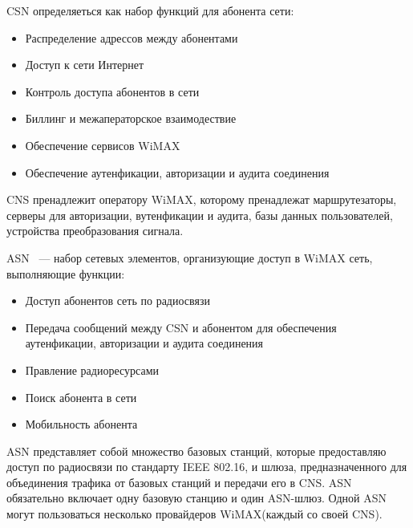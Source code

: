 \documentclass[14pt,a4paper]{article}
\begin{document}
CSN определяеться как набор функций для
абонента сети:
\begin{itemize}
\item{}Распределение адрессов между абонентами
\item{}Доступ к сети Интернет
\item{}Контроль доступа абонентов в сети
\item{}Биллинг и межаператорское взаимодествие
\item{}Обеспечение сервисов WiMAX
\item{}Обеспечение аутенфикации, авторизации и аудита соединения
\end{itemize}
CNS пренадлежит оператору WiMAX, которому пренадлежат маршрутезаторы, серверы
для авторизации, вутенфикации и аудита, базы данных пользователей, устройства
преобразования сигнала.

ASN ~--- набор сетевых элементов, организующие доступ в WiMAX сеть, выполняющие
функции:
\begin{itemize}
\item{}Доступ абонентов сеть по радиосвязи
\item{}Передача сообщений между CSN и абонентом для обеспечения аутенфикации,
авторизации и аудита соединения
\item{}Правление радиоресурсами
\item{}Поиск абонента в сети
\item{}Мобильность абонента
\end{itemize}
ASN представляет собой множество базовых станций, которые предоставляю доступ по
радиосвязи по стандарту IEEE 802.16, и шлюза, предназначенного для объединения
трафика от базовых станций и передачи его в CNS. ASN обязательно включает одну
базовую станцию и один ASN-шлюз. Одной ASN могут пользоваться несколько
провайдеров WiMAX(каждый со своей CNS).

\newpage
{}

\end{document}
